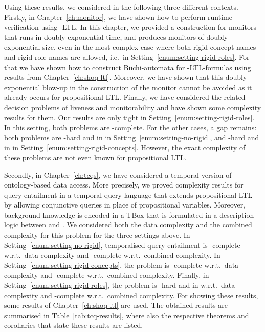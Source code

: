 Using these results, we considered in the following three different contexts.
Firstly, in Chapter~\ref{ch:monitor}, we have shown how to perform runtime
verification using \SHOQ-LTL\@.  In this chapter, we provided a construction for
monitors that runs in doubly exponential time, and produces monitors of doubly
exponential size, even in the most complex case where both rigid concept names
and rigid role names are allowed, i.e.~in
Setting~\ref{enum:setting-rigid-roles}.  For that we have shown how to construct
Büchi-automata for \SHOQ-LTL-formulas using results from
Chapter~\ref{ch:shoq-ltl}.  Moreover, we have shown that this doubly exponential
blow-up in the construction of the monitor cannot be avoided as it already
occurs for propositional LTL\@.  Finally, we have considered the related
decision problems of liveness and monitorability and have shown some complexity
results for them.  Our results are only tight in
Setting~\ref{enum:setting-rigid-roles}.  In this setting, both problems are
\TwoExpTime-complete.  For the other cases, a gap remains: both problems are
\ExpTime-hard and in \TwoExpTime in Setting~\ref{enum:setting-no-rigid}, and
\coNExpTime-hard and in \TwoExpTime in
Setting~\ref{enum:setting-rigid-concepts}.  However, the exact complexity of
these problems are not even known for propositional LTL\@.

Secondly, in Chapter~\ref{ch:tcqs}, we have considered a temporal version of
ontology-based data access.  More precisely, we proved complexity results for
query entailment in a temporal query language that extends propositional LTL by
allowing conjunctive queries in place of propositional variables.  Moreover,
background knowledge is encoded in a TBox that is formulated in a description
logic between \ALC and \SHQ.  We considered both the data complexity and the
combined complexity for this problem for the three settings above.  In
Setting~\ref{enum:setting-no-rigid}, temporalised query entailment is
\coNP-complete w.r.t.\ data complexity and \ExpTime-complete w.r.t.\ combined
complexity.  In Setting~\ref{enum:setting-rigid-concepts}, the problem is
\coNP-complete w.r.t.\ data complexity and \coNExpTime-complete w.r.t.\ combined
complexity.  Finally, in Setting~\ref{enum:setting-rigid-roles}, the problem is
\coNP-hard and in \ExpTime w.r.t.\ data complexity and \TwoExpTime-complete
w.r.t.\ combined complexity.  For showing these results, some results of
Chapter~\ref{ch:shoq-ltl} are used.  The obtained results are summarised in
Table~\ref{tab:tcq-results}, where also the respective theorems and corollaries
that state these results are listed.

